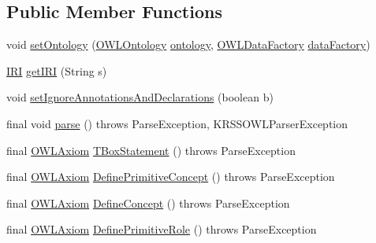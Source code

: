 \subsection*{Public Member Functions}
\begin{DoxyCompactItemize}
\item 
void \hyperlink{classorg_1_1coode_1_1owl_1_1krssparser_1_1_k_r_s_s_parser_af26a007648c9fcc5ecd284a21143bc54}{set\-Ontology} (\hyperlink{interfaceorg_1_1semanticweb_1_1owlapi_1_1model_1_1_o_w_l_ontology}{O\-W\-L\-Ontology} \hyperlink{classorg_1_1coode_1_1owl_1_1krssparser_1_1_k_r_s_s_parser_afb103accd331ec09fc3999f5faccb476}{ontology}, \hyperlink{interfaceorg_1_1semanticweb_1_1owlapi_1_1model_1_1_o_w_l_data_factory}{O\-W\-L\-Data\-Factory} \hyperlink{classorg_1_1coode_1_1owl_1_1krssparser_1_1_k_r_s_s_parser_a7fd93f66ce249a5524b8bc07c0d25d13}{data\-Factory})
\item 
\hyperlink{classorg_1_1semanticweb_1_1owlapi_1_1model_1_1_i_r_i}{I\-R\-I} \hyperlink{classorg_1_1coode_1_1owl_1_1krssparser_1_1_k_r_s_s_parser_ac2c2ae1253a7a081ddc3ec3b219ea8bc}{get\-I\-R\-I} (String s)
\item 
void \hyperlink{classorg_1_1coode_1_1owl_1_1krssparser_1_1_k_r_s_s_parser_a664d51f186b2a820dfa06311b362d0b1}{set\-Ignore\-Annotations\-And\-Declarations} (boolean b)
\item 
final void \hyperlink{classorg_1_1coode_1_1owl_1_1krssparser_1_1_k_r_s_s_parser_af80a0e0b9d3c82dabdffe6a4a78326ba}{parse} ()  throws Parse\-Exception, K\-R\-S\-S\-O\-W\-L\-Parser\-Exception 
\item 
final \hyperlink{interfaceorg_1_1semanticweb_1_1owlapi_1_1model_1_1_o_w_l_axiom}{O\-W\-L\-Axiom} \hyperlink{classorg_1_1coode_1_1owl_1_1krssparser_1_1_k_r_s_s_parser_ae1c88fc6567e5943e41c2142f1367b13}{T\-Box\-Statement} ()  throws Parse\-Exception 
\item 
final \hyperlink{interfaceorg_1_1semanticweb_1_1owlapi_1_1model_1_1_o_w_l_axiom}{O\-W\-L\-Axiom} \hyperlink{classorg_1_1coode_1_1owl_1_1krssparser_1_1_k_r_s_s_parser_a256873a56759df9b624b7c3c2af3a05a}{Define\-Primitive\-Concept} ()  throws Parse\-Exception 
\item 
final \hyperlink{interfaceorg_1_1semanticweb_1_1owlapi_1_1model_1_1_o_w_l_axiom}{O\-W\-L\-Axiom} \hyperlink{classorg_1_1coode_1_1owl_1_1krssparser_1_1_k_r_s_s_parser_a6dfeec3065d1da5e8ed65d59a519e5a0}{Define\-Concept} ()  throws Parse\-Exception 
\item 
final \hyperlink{interfaceorg_1_1semanticweb_1_1owlapi_1_1model_1_1_o_w_l_axiom}{O\-W\-L\-Axiom} \hyperlink{classorg_1_1coode_1_1owl_1_1krssparser_1_1_k_r_s_s_parser_aa6561881de48daab0b3b96623ee24bd5}{Define\-Primitive\-Role} ()  throws Parse\-Exception 

\end{DoxyCompactItemize}

